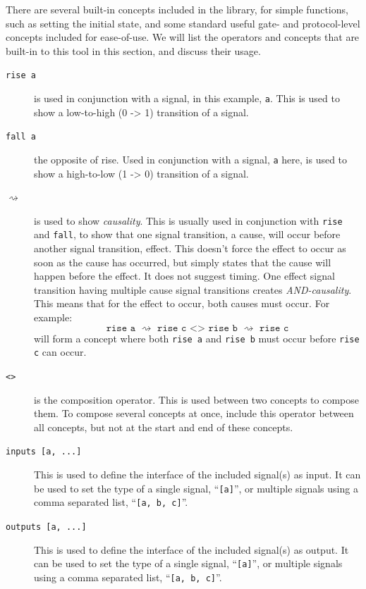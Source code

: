 \documentclass{proc}
\begin{document}
There are several built-in concepts included in the library, for simple functions, such as setting the initial state, and some standard useful gate- and protocol-level concepts included for 
ease-of-use. We will list the operators and concepts that are built-in to this tool in this section, and discuss their usage. 

\begin{description}
  \item [\texttt{rise a}] is used in conjunction with a signal, in this example, \texttt{a}. This is used to show a low-to-high (0 -> 1) transition of a signal.
  
  \item [\texttt{fall a}] the opposite of rise. Used in conjunction with a signal, \texttt{a} here,  is used to show a high-to-low (1 -> 0) transition of a signal.
  
  \item [$\rightsquigarrow$] is used to show \emph{causality}. This is usually used in conjunction with \texttt{rise} and \texttt{fall}, to show that one signal transition, a cause, will occur 
   before another signal transition, effect. This doesn't force the effect to occur as soon as the cause has occurred, but simply states that the cause will happen before the effect. It does 
   not suggest timing. One effect signal transition having multiple cause signal transitions creates \emph{AND-causality}. This means that for the effect to occur, both causes must occur. 
   For example: 
   \[
   \texttt{rise a $\rightsquigarrow$ rise c <> rise b $\rightsquigarrow$ rise c}
   \]
   will form a concept where both \texttt{rise a} and \texttt{rise b} must occur before \texttt{rise c} can occur.
   
   \item [\texttt{<>}] is the composition operator. This is used between two concepts to compose them. To compose several concepts at once, include this operator between all concepts, 
   but not at the start and end of these concepts. 
   
   \item [\texttt{inputs [a, ...]}] This is used to define the interface of the included signal(s) as input. It can be used to set the type of a single signal, ``\texttt{[a]}'', or multiple signals   
   using a comma separated list, ``\texttt{[a, b, c]}''.
   
   \item [\texttt{outputs [a, ...]}] This is used to define the interface of the included signal(s) as output. It can be used to set the type of a single signal, ``\texttt{[a]}'', or multiple signals 
   using a comma separated list, ``\texttt{[a, b, c]}''.
   

\end{description}
\end{document}
